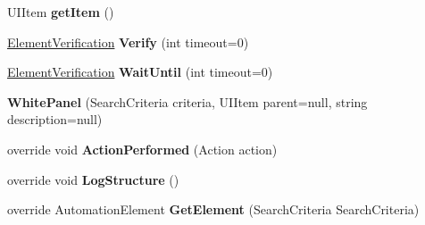 \begin{DoxyCompactItemize}
\item 
\hypertarget{class_proto_test_1_1_golem_1_1_white_1_1_elements_1_1_white_panel_ab6558792b83f4c37cfae3a72855ed78f}{U\-I\-Item {\bfseries get\-Item} ()}\label{class_proto_test_1_1_golem_1_1_white_1_1_elements_1_1_white_panel_ab6558792b83f4c37cfae3a72855ed78f}

\item 
\hypertarget{class_proto_test_1_1_golem_1_1_white_1_1_elements_1_1_white_panel_a8749684e60acc7e92aa4688c22bc7606}{\hyperlink{class_proto_test_1_1_golem_1_1_white_1_1_element_verification}{Element\-Verification} {\bfseries Verify} (int timeout=0)}\label{class_proto_test_1_1_golem_1_1_white_1_1_elements_1_1_white_panel_a8749684e60acc7e92aa4688c22bc7606}

\item 
\hypertarget{class_proto_test_1_1_golem_1_1_white_1_1_elements_1_1_white_panel_ae8d405e3963950015d9cf0d068c614e5}{\hyperlink{class_proto_test_1_1_golem_1_1_white_1_1_element_verification}{Element\-Verification} {\bfseries Wait\-Until} (int timeout=0)}\label{class_proto_test_1_1_golem_1_1_white_1_1_elements_1_1_white_panel_ae8d405e3963950015d9cf0d068c614e5}

\item 
\hypertarget{class_proto_test_1_1_golem_1_1_white_1_1_elements_1_1_white_panel_aaf8706418c0e1fc7ab07bbb40dd7af5e}{{\bfseries White\-Panel} (Search\-Criteria criteria, U\-I\-Item parent=null, string description=null)}\label{class_proto_test_1_1_golem_1_1_white_1_1_elements_1_1_white_panel_aaf8706418c0e1fc7ab07bbb40dd7af5e}

\item 
\hypertarget{class_proto_test_1_1_golem_1_1_white_1_1_elements_1_1_white_panel_aa8ec2f1c87279f2465c481208a959719}{override void {\bfseries Action\-Performed} (Action action)}\label{class_proto_test_1_1_golem_1_1_white_1_1_elements_1_1_white_panel_aa8ec2f1c87279f2465c481208a959719}

\item 
\hypertarget{class_proto_test_1_1_golem_1_1_white_1_1_elements_1_1_white_panel_a824d8aba5883a6d97400193be69d4bf3}{override void {\bfseries Log\-Structure} ()}\label{class_proto_test_1_1_golem_1_1_white_1_1_elements_1_1_white_panel_a824d8aba5883a6d97400193be69d4bf3}

\item 
\hypertarget{class_proto_test_1_1_golem_1_1_white_1_1_elements_1_1_white_panel_a0c185834011d423204dfc088db8bfd09}{override Automation\-Element {\bfseries Get\-Element} (Search\-Criteria Search\-Criteria)}\label{class_proto_test_1_1_golem_1_1_white_1_1_elements_1_1_white_panel_a0c185834011d423204dfc088db8bfd09}


\end{DoxyCompactItemize}
